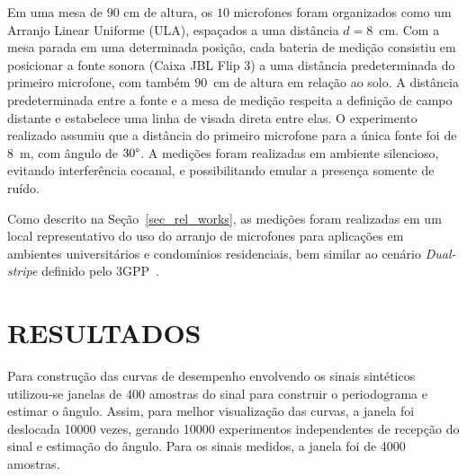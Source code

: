 \documentclass{sbrt2017port}
\begin{document}
Em uma mesa de $90$ cm de altura,  os $10$ microfones foram organizados como um Arranjo Linear Uniforme (ULA), espaçados a uma distância $d=8$~cm. Com a mesa parada em uma determinada posição, cada bateria de medição consistiu em posicionar a fonte sonora (Caixa JBL Flip $3$) a uma distância predeterminada do primeiro microfone, com também $90$~cm de altura em relação ao solo. A distância predeterminada entre a fonte e a mesa de medição respeita a definição de campo distante e estabelece uma linha de visada direta entre elas. O experimento realizado assumiu que a distância do primeiro microfone para a única fonte foi de 8~m, com ângulo de $30\degree$. A medições foram realizadas em ambiente silencioso, evitando interferência cocanal, e possibilitando emular a presença somente de ruído.

  
 



Como descrito na Seção~\ref{sec_rel_works}, as medições foram realizadas em um local representativo do uso do arranjo de microfones para aplicações em ambientes universitários e condomínios residenciais, bem similar ao cenário \emph{Dual-stripe} definido pelo 3GPP~\cite{3GPP_R4_092042}. 
  

\section{RESULTADOS}
\label{sec_res}

Para construção das curvas de desempenho envolvendo os sinais sintéticos utilizou-se janelas de 400 amostras do sinal para construir o periodograma e estimar o ângulo. Assim, para melhor visualização das curvas, a janela foi deslocada 10000 vezes, gerando 10000 experimentos independentes de recepção do sinal e estimação do ângulo. Para os sinais medidos, a janela foi de 4000 amostras.
\end{document}
